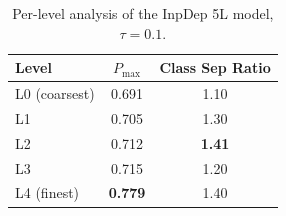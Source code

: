 \begin{table}[h]
\centering
\caption{Per-level analysis of the InpDep 5L model, $\tau=0.1$.}
\begin{tabular}{lcc}
\hline
\textbf{Level} & $P_{\max}$ & \textbf{Class Sep Ratio} \\
\hline
L0 (coarsest) & 0.691 & 1.10 \\
L1               & 0.705 & 1.30 \\
L2               & 0.712 & \textbf{1.41} \\
L3               & 0.715 & 1.20 \\
L4 (finest) & \textbf{0.779} & 1.40 \\
\hline
\end{tabular}
\end{table}
